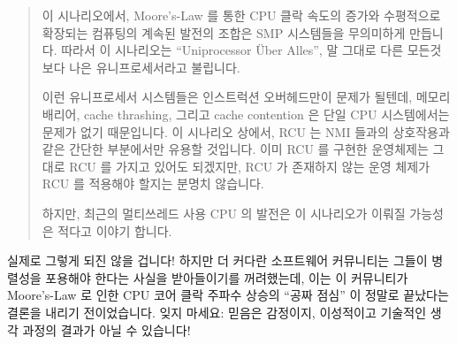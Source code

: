 \begin{quote}
	이 시나리오에서, Moore's-Law 를 통한 CPU 클락 속도의 증가와 수평적으로
	확장되는 컴퓨팅의 계속된 발전의 조합은 SMP 시스템들을 무의미하게
	만듭니다.
	따라서 이 시나리오는 ``Uniprocessor \"Uber Alles'', 말 그대로 다른
	모든것보다 나은 유니프로세서라고 불립니다.

	이런 유니프로세서 시스템들은 인스트럭션 오버헤드만이 문제가 될텐데,
	메모리 배리어, cache thrashing, 그리고 cache contention 은 단일 CPU
	시스템에서는 문제가 없기 때문입니다.
	이 시나리오 상에서, RCU 는 NMI 들과의 상호작용과 같은 간단한 부분에서만
	유용할 것입니다.
	이미 RCU 를 구현한 운영체제는 그대로 RCU 를 가지고 있어도 되겠지만, RCU
	가 존재하지 않는 운영 체제가 RCU 를 적용해야 할지는 분명치 않습니다.

	하지만, 최근의 멀티쓰레드 사용 CPU 의 발전은 이 시나리오가 이뤄질
	가능성은 적다고 이야기 합니다.

\end{quote}

실제로 그렇게 되진 않을 겁니다!
하지만 더 커다란 소프트웨어 커뮤니티는 그들이 병렬성을 포용해야 한다는 사실을
받아들이기를 꺼려했는데, 이는 이 커뮤니티가 Moore's-Law 로 인한 CPU 코어 클락
주파수 상승의 ``공짜 점심'' 이 정말로 끝났다는 결론을 내리기 전이었습니다.
잊지 마세요: 믿음은 감정이지, 이성적이고 기술적인 생각 과정의 결과가 아닐 수
있습니다!

